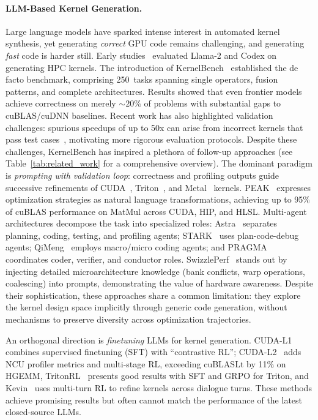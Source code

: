 \paragraph{LLM-Based Kernel Generation.}
Large language models have sparked intense interest in automated kernel synthesis, yet generating \textit{correct} GPU code remains challenging, and generating \textit{fast} code is harder still. Early studies~\citep{valero2023comparing, godoy2023evaluation} evaluated Llama-2 and Codex on generating HPC kernels. The introduction of KernelBench~\citep{ouyang2025kernelbench} established the de facto benchmark, comprising 250~tasks spanning single operators, fusion patterns, and complete architectures. Results showed that even frontier models achieve correctness on merely ${\sim}20\%$ of problems with substantial gaps to cuBLAS/cuDNN baselines. Recent work has also highlighted validation challenges: spurious speedups of up to 50x can arise from incorrect kernels that pass test cases~\citep{lange2025towards, zhu2025establishing}, motivating more rigorous evaluation protocols. 
Despite these challenges, KernelBench has inspired a plethora of follow-up approaches (see Table~\ref{tab:related_work} for a comprehensive overview). 
The dominant paradigm is \textit{prompting with validation loop}: correctness and profiling outputs guide successive refinements of 
CUDA~\citep{chen2025cuda, zhang2025cudaforge, lange2025towards}, Triton~\citep{liao2025kernelevolve, li2025tritonforge}, and Metal~\citep{gimlet} kernels. PEAK~\citep{tariq2025peak} expresses optimization strategies as natural language transformations, achieving up to 95\% of cuBLAS performance on MatMul across CUDA, HIP, and HLSL. Multi-agent architectures decompose the task into specialized roles: Astra~\citep{wei2025astra} separates planning, coding, testing, and profiling agents; STARK~\citep{dong2025stark} uses plan-code-debug agents; QiMeng~\citep{zhu2025qimeng} employs macro/micro coding agents; and PRAGMA~\citep{lei2025pragma} coordinates coder, verifier, and conductor roles. SwizzlePerf~\citep{tschand2025swizzleperf} stands out by injecting detailed microarchitecture knowledge (bank conflicts, warp operations, coalescing) into prompts, demonstrating the value of hardware awareness. Despite their sophistication, these approaches share a common limitation: they explore the kernel design space implicitly through generic code generation, without mechanisms to preserve diversity across optimization trajectories.

An orthogonal direction is \textit{finetuning} LLMs for kernel generation. CUDA-L1~\citep{li2025cuda} combines supervised finetuning (SFT) with ``contrastive RL''; CUDA-L2~\citep{su2025cuda} adds NCU profiler metrics and multi-stage RL, exceeding cuBLASLt by 11\% on HGEMM, TritonRL~\citep{woo2025tritonrl} presents good results with SFT and GRPO for Triton, and Kevin~\citep{baronio2025kevin} uses multi-turn RL to refine kernels across dialogue turns. These methods achieve promising results but often cannot match the performance of the latest closed-source LLMs.

